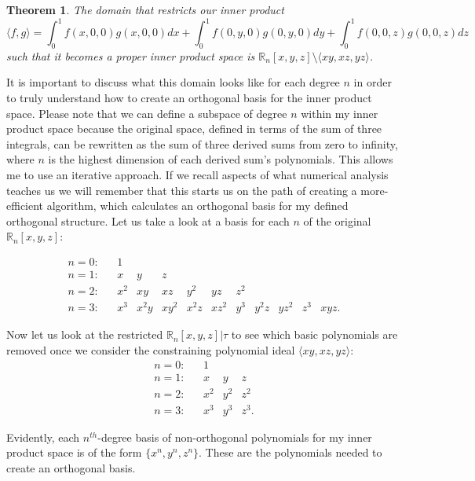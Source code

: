 \documentclass[letterpaper, 12pt]{article}
\newtheorem{thm}{Theorem}[section]
\begin{document}
\vspace{1mm}
\begin{thm}
	The domain that restricts our inner product
	$$\langle f, g\rangle = \int_0^1 f(x,0,0)g(x,0,0) dx + \int_0^1 f(0,y,0)g(0,y,0) dy + \int_0^1 f(0,0,z)g(0,0,z) dz$$
	such that it becomes a proper inner product space is $\mathbb{R}_n [x, y, z] \setminus \langle xy, xz, yz \rangle$.
\end{thm}

\vspace{1mm}
It is important to discuss what this domain looks like for each degree $n$ in order to truly understand how to create an orthogonal basis for the inner product space. Please note that we can define a subspace of degree $n$ within my inner product space because the original space, defined in terms of the sum of three integrals, can be rewritten as the sum of three derived sums from zero to infinity, where $n$ is the highest dimension of each derived sum's polynomials. This allows me to use an iterative approach. If we recall aspects of what numerical analysis teaches us we will remember that this starts us on the path of creating a more-efficient algorithm, which calculates an orthogonal basis for my defined orthogonal structure. Let us take a look at a basis for each $n$ of the original $\mathbb{R}_n [x, y, z]$:

\newpage
\vspace*{-16mm}
$$\begin{array}{llllllllllll}
	n=0: && 1 \\
	n=1: && x & y & z \\
	n=2: && x^2 & xy & xz & y^2 & yz & z^2 \\
	n=3: && x^3 & x^2y & xy^2 & x^2z & xz^2 & y^3 & y^2z & yz^2 & z^3 & xyz.
\end{array}$$

\vspace{3mm}
\noindent Now let us look at the restricted $\mathbb{R}_n [x, y, z] | \tau$  to see which basic polynomials are removed once we consider the constraining polynomial ideal $\langle xy, xz, yz\rangle$:
$$\begin{array}{lllll}
	n=0: && 1 \\
	n=1: && x & y & z \\
	n=2: && x^2 & y^2 & z^2 \\
	n=3: && x^3 & y^3 & z^3.
\end{array}$$

\noindent Evidently, each $n^{th}$-degree basis of non-orthogonal polynomials for my inner product space is of the form $\{x^n, y^n, z^n\}$. These are the polynomials needed to create an orthogonal basis. 
\end{document}
